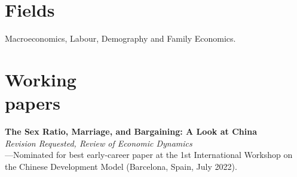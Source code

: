 \documentclass[margin]{res} %
\begin{document}
\begin{resume}
%	
%	
%	
%	

\section{Fields}

Macroeconomics, Labour, Demography and Family Economics.

\section{Working \\ papers}
{\bf The Sex Ratio, Marriage, and Bargaining: A Look at China}  \\
\textit{Revision Requested, Review of Economic Dynamics} \\
---Nominated for best early-career paper at the 1st International Workshop on the Chinese Development Model (Barcelona, Spain, July 2022). 


\end{resume}
\end{document}

